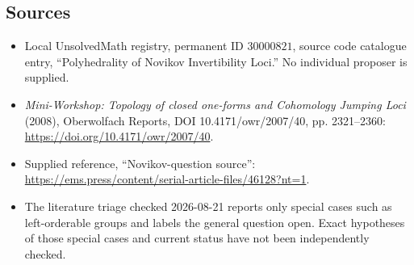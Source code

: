 \documentclass[11pt]{article}
\begin{document}
\subsection{Sources}
\begin{itemize}
\item Local UnsolvedMath registry, permanent ID \(30000821\), source code catalogue entry, ``Polyhedrality of Novikov Invertibility Loci.'' No individual proposer is supplied.
\item \emph{Mini-Workshop: Topology of closed one-forms and Cohomology Jumping Loci} (2008), Oberwolfach Reports, DOI 10.4171/owr/2007/40, pp. 2321--2360: \url{https://doi.org/10.4171/owr/2007/40}.
\item Supplied reference, ``Novikov-question source'': \url{https://ems.press/content/serial-article-files/46128?nt=1}.
\item The literature triage checked 2026-08-21 reports only special cases such as left-orderable groups and labels the general question open. Exact hypotheses of those special cases and current status have not been independently checked.
\end{itemize}
\end{document}

